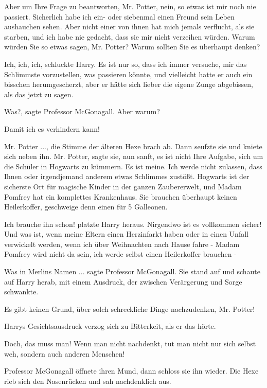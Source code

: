 \glqq{}Aber um Ihre Frage zu beantworten, Mr. Potter, nein, so etwas ist mir
noch nie passiert. Sicherlich habe ich ein- oder siebenmal einen Freund sein
Leben aushauchen sehen. Aber nicht einer von ihnen hat mich jemals verflucht,
als sie starben, und ich habe nie gedacht, dass sie mir nicht verzeihen würden.
Warum würden Sie so etwas sagen, Mr. Potter? Warum sollten Sie es überhaupt
denken?\grqq{}

\glqq{}Ich, ich, ich\grqq{}, schluckte Harry. \glqq{}Es ist nur so, dass ich
immer versuche, mir das Schlimmste vorzustellen, was passieren könnte\grqq{},
und vielleicht hatte er auch ein bisschen herumgescherzt, aber er hätte sich
lieber die eigene Zunge abgebissen, als das jetzt zu sagen.

\glqq{}Was?\grqq{}, sagte Professor McGonagall. \glqq{}Aber warum?\grqq{}

\glqq{}Damit ich es verhindern kann!\grqq{}

\glqq{}Mr. Potter ...\grqq{}, die Stimme der älteren Hexe brach ab. Dann seufzte
sie und kniete sich neben ihn. \glqq{}Mr. Potter\grqq{}, sagte sie, nun sanft,
\glqq{}es ist nicht Ihre Aufgabe, sich um die Schüler in Hogwarts zu kümmern. Es
ist meine. Ich werde nicht zulassen, dass Ihnen oder irgendjemand anderem etwas
Schlimmes zustößt. Hogwarts ist der sicherste Ort für magische Kinder in der
ganzen Zaubererwelt, und Madam Pomfrey hat ein komplettes Krankenhaus. Sie
brauchen überhaupt keinen Heilerkoffer, geschweige denn einen für 5
Galleonen.\grqq{}

\glqq{}Ich brauche ihn schon!\grqq{} platzte Harry heraus. \glqq{}Nirgendwo ist
es vollkommen sicher! Und was ist, wenn meine Eltern einen Herzinfarkt haben
oder in einen Unfall verwickelt werden, wenn ich über Weihnachten nach Hause
fahre - Madam Pomfrey wird nicht da sein, ich werde selbst einen Heilerkoffer
brauchen -\grqq{}

\glqq{}Was in Merlins Namen ...\grqq{} sagte Professor McGonagall. Sie stand auf
und schaute auf Harry herab, mit einem Ausdruck, der zwischen Verärgerung und
Sorge schwankte.

\glqq{}Es gibt keinen Grund, über solch schreckliche Dinge nachzudenken, Mr.
Potter!\grqq{}

Harrys Gesichtsausdruck verzog sich zu Bitterkeit, als er das hörte.

\glqq{}Doch, das muss man! Wenn man nicht nachdenkt, tut man nicht nur sich
selbst weh, sondern auch anderen Menschen!\grqq{}

Professor McGonagall öffnete ihren Mund, dann schloss sie ihn wieder. Die Hexe
rieb sich den Nasenrücken und sah nachdenklich aus.

